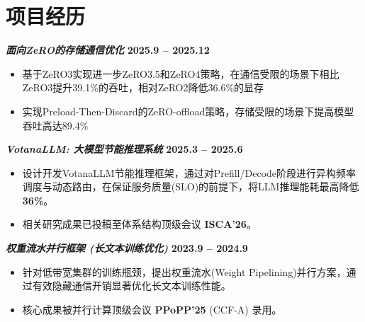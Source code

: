 \documentclass{resume}
\newenvironment{compactproject}[2]{
    \vspace{3pt} %
    \noindent\textbf{\textit{#1}} %
    \hfill
    \textbf{#2} %
    \par\vspace{2pt} %
    \begin{itemize}[leftmargin=1.2em, topsep=1pt, partopsep=0pt, itemsep=0pt, parsep=1pt]
}{
    \end{itemize}
}
\begin{document}
\section{项目经历}
\begin{compactproject}{面向ZeRO的存储通信优化}{2025.9 -- 2025.12}
\item 基于ZeRO3实现进一步ZeRO3.5和ZeRO4策略，在通信受限的场景下相比ZeRO3提升39.1\%的吞吐，相对ZeRO2降低36.6\%的显存
\item 实现Preload-Then-Discard的ZeRO-offload策略，存储受限的场景下提高模型吞吐高达89.4\%

\end{compactproject}
\begin{compactproject}{VotanaLLM: 大模型节能推理系统}{2025.3 -- 2025.6}
\item 设计开发VotanaLLM节能推理框架，通过对Prefill/Decode阶段进行异构频率调度与动态路由，在保证服务质量(SLO)的前提下，将LLM推理能耗最高降低\textbf{36\%}。
\item 相关研究成果已投稿至体系结构顶级会议 \textbf{ISCA'26}。
\end{compactproject}

\begin{compactproject}{权重流水并行框架 (长文本训练优化)}{2023.9 -- 2024.9}
\item 针对低带宽集群的训练瓶颈，提出权重流水(Weight Pipelining)并行方案，通过有效隐藏通信开销显著优化长文本训练性能。
\item 核心成果被并行计算顶级会议 \textbf{PPoPP'25} (CCF-A) 录用。
\end{compactproject}


\end{document}
